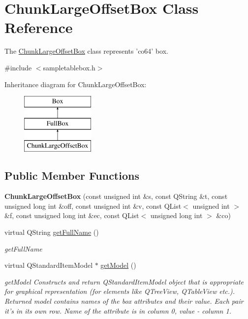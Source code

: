 \hypertarget{class_chunk_large_offset_box}{\section{Chunk\-Large\-Offset\-Box Class Reference}
\label{class_chunk_large_offset_box}
}


The \hyperlink{class_chunk_large_offset_box}{Chunk\-Large\-Offset\-Box} class represents 'co64' box.  




{\ttfamily \#include $<$sampletablebox.\-h$>$}

Inheritance diagram for Chunk\-Large\-Offset\-Box\-:\begin{figure}[H]
\begin{center}
\leavevmode
\includegraphics[height=3.000000cm]{class_chunk_large_offset_box}
\end{center}
\end{figure}
\subsection*{Public Member Functions}
\begin{DoxyCompactItemize}
\item 
\hypertarget{class_chunk_large_offset_box_ab5be759993cf2d794c6ecdc1829e45f4}{{\bfseries Chunk\-Large\-Offset\-Box} (const unsigned int \&s, const Q\-String \&t, const unsigned long int \&off, const unsigned int \&v, const Q\-List$<$ unsigned int $>$ \&f, const unsigned long int \&ec, const Q\-List$<$ unsigned long int $>$ \&co)}\label{class_chunk_large_offset_box_ab5be759993cf2d794c6ecdc1829e45f4}

\item 
virtual Q\-String \hyperlink{class_chunk_large_offset_box_acdadc159668e5e6ab286dbb840877f31}{get\-Full\-Name} ()
\begin{DoxyCompactList}\small\item\em get\-Full\-Name \end{DoxyCompactList}\item 
virtual Q\-Standard\-Item\-Model $\ast$ \hyperlink{class_chunk_large_offset_box_a16b02676650f3c08360bad4ac35470aa}{get\-Model} ()
\begin{DoxyCompactList}\small\item\em get\-Model Constructs and return Q\-Standard\-Item\-Model object that is appropriate for graphical representation (for elements like Q\-Tree\-View, Q\-Table\-View etc.). Returned model contains names of the box attributes and their value. Each pair it's in its own row. Name of the attribute is in column 0, value -\/ column 1. \end{DoxyCompactList}\end{DoxyCompactItemize}
